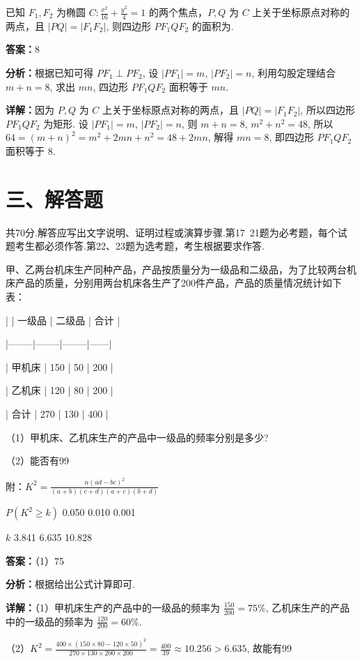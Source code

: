 \begin{question}[points=5]
已知 $F_1, F_2$ 为椭圆 $C: \frac{x^2}{16} + \frac{y^2}{4} = 1$ 的两个焦点，$P, Q$ 为 $C$ 上关于坐标原点对称的两点，且 $|PQ| = |F_1F_2|$, 则四边形 $PF_1QF_2$ 的面积为.
\fillin[{$8$}]
\begin{solution}
\textbf{答案：}$8$

\textbf{分析：}根据已知可得 $PF_1 \perp PF_2$, 设 $|PF_1| = m$, $|PF_2| = n$, 利用勾股定理结合 $m+n=8$, 求出 $mn$, 四边形 $PF_1QF_2$ 面积等于 $mn$.

\textbf{详解：}因为 $P, Q$ 为 $C$ 上关于坐标原点对称的两点，且 $|PQ| = |F_1F_2|$, 所以四边形 $PF_1QF_2$ 为矩形. 设 $|PF_1| = m$, $|PF_2| = n$, 则 $m+n=8$, $m^2+n^2=48$, 所以 $64 = (m+n)^2 = m^2 + 2mn + n^2 = 48 + 2mn$, 解得 $mn=8$, 即四边形 $PF_1QF_2$ 面积等于 $8$.
\end{solution}
\end{question}

\section*{三、解答题}
共70分.解答应写出文字说明、证明过程或演算步骤.第17~21题为必考题，每个试题考生都必须作答.第22、23题为选考题，考生根据要求作答.

\begin{question}[points=12]
甲、乙两台机床生产同种产品，产品按质量分为一级品和二级品，为了比较两台机床产品的质量，分别用两台机床各生产了200件产品，产品的质量情况统计如下表：



|        | 一级品 | 二级品 | 合计 |

|--------|--------|--------|------|

| 甲机床 | 150    | 50     | 200  |

| 乙机床 | 120    | 80     | 200  |

| 合计   | 270    | 130    | 400  |



（1）甲机床、乙机床生产的产品中一级品的频率分别是多少?



（2）能否有99%



附：$K^2 = \frac{n(ad-bc)^2}{(a+b)(c+d)(a+c)(b+d)}$



$P(K^2 \ge k)$  0.050  0.010  0.001



$k$          3.841  6.635  10.828
\begin{solution}
\textbf{答案：}（1）75%

\textbf{分析：}根据给出公式计算即可.

\textbf{详解：}（1）甲机床生产的产品中的一级品的频率为 $\frac{150}{200}=75\%$, 乙机床生产的产品中的一级品的频率为 $\frac{120}{200}=60\%$.

（2）$K^2 = \frac{400 \times (150\times80 - 120\times50)^2}{270\times130\times200\times200} = \frac{400}{39} \approx 10.256 > 6.635$, 故能有99%
\end{solution}
\end{question}

